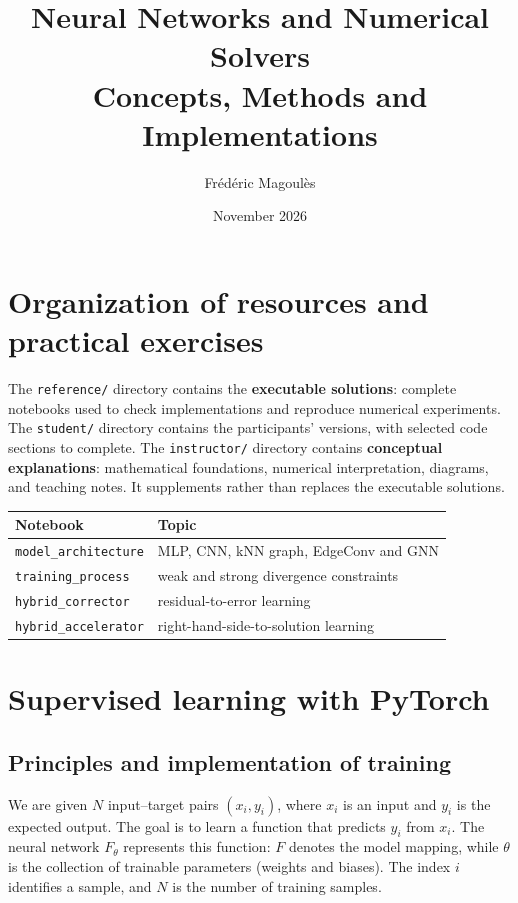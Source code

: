 \documentclass[11pt,a4paper]{article}
\title{Neural Networks and Numerical Solvers\\\large Concepts, Methods and Implementations}
\author{Frédéric Magoulès}
\date{November 2026}
\begin{document}
\maketitle\tableofcontents\newpage

\section{Organization of resources and practical exercises}

The \texttt{reference/} directory contains the \textbf{executable solutions}: complete notebooks used to check implementations and reproduce numerical experiments.
The \texttt{student/} directory contains the participants' versions, with selected code sections to complete.
The \texttt{instructor/} directory contains \textbf{conceptual explanations}: mathematical foundations, numerical interpretation, diagrams, and teaching notes. It supplements rather than replaces the executable solutions.
\begin{center}\begin{tabular}{ll}\toprule Notebook & Topic \\\midrule
\texttt{model\_architecture} & MLP, CNN, kNN graph, EdgeConv and GNN\\
\texttt{training\_process} & weak and strong divergence constraints\\
\texttt{hybrid\_corrector} & residual-to-error learning\\
\texttt{hybrid\_accelerator} & right-hand-side-to-solution learning\\\bottomrule\end{tabular}\end{center}

\section{Supervised learning with PyTorch}

\subsection{Principles and implementation of training}

We are given $N$ input--target pairs $(x_i,y_i)$, where $x_i$ is an input and $y_i$ is the expected output. The goal is to learn a function that predicts $y_i$ from $x_i$. The neural network $F_\theta$ represents this function: $F$ denotes the model mapping, while $\theta$ is the collection of trainable parameters (weights and biases). The index $i$ identifies a sample, and $N$ is the number of training samples.
\end{document}
